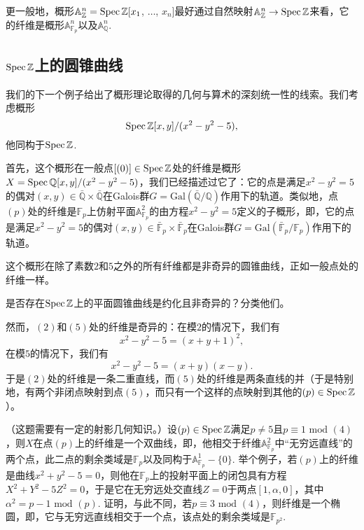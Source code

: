 更一般地，概形$\mathbb{A}_{\mathbb{Z}}^n=\operatorname{Spec} \mathbb{Z}[x_1$, $\dots$, $x_n]$最好通过自然映射$\mathbb{A}_{\mathbb{Z}}^n\to\operatorname{Spec} \mathbb{Z}$来看，它的纤维是概形$\mathbb{A}_{\mathbb{F}_p}^n$以及$\mathbb{A}_{\mathbb{Q}}^n$.

\subsection{$\operatorname{Spec} \mathbb{Z}$上的圆锥曲线}\label{sec:2.4.4}

我们的下一个例子给出了概形理论取得的几何与算术的深刻统一性的线索。我们考虑概形
\[
	\operatorname{Spec} \mathbb{Z}[x,y]/(x^2-y^2-5),
\]
他同构于$\operatorname{Spec} \mathbb{Z}$.

首先，这个概形在一般点$[(0)]\in \operatorname{Spec} \mathbb{Z}$处的纤维是概形$X=\operatorname{Spec} \mathbb{Q}[x,y]/(x^2-y^2-5)$，我们已经描述过它了：它的点是满足$x^2-y^2=5$的偶对$(x,y)\in \bar{\mathbb{Q}}\times \bar{\mathbb{Q}}$在Galois群$G=\mathrm{Gal}(\bar{\mathbb{Q}}/\mathbb{Q})$作用下的轨道。类似地，点$(p)$处的纤维是$\mathbb{F}_p$上仿射平面$\mathbb{A}_{\mathbb{F}_p}^2$的由方程$x^2-y^2=5$定义的子概形，即，它的点是满足$x^2-y^2=5$的偶对$(x,y)\in \bar{\mathbb{F}}_p\times \bar{\mathbb{F}}_p$在Galois群$G=\mathrm{Gal}(\bar{\mathbb{F}}_p/\mathbb{F}_p)$作用下的轨道。

这个概形在除了素数$2$和$5$之外的所有纤维都是非奇异的圆锥曲线，正如一般点处的纤维一样。

\begin{exe}
	是否存在$\operatorname{Spec} \mathbb{Z}$上的平面圆锥曲线是约化且非奇异的？分类他们。
\end{exe}

然而，$(2)$和$(5)$处的纤维是奇异的：在模$2$的情况下，我们有
\[
	x^2-y^2-5=(x+y+1)^2,
\]
在模$5$的情况下，我们有
\[
	x^2-y^2-5=(x+y)(x-y).
\]
于是$(2)$处的纤维是一条二重直线，而$(5)$处的纤维是两条直线的并（于是特别地，有两个非闭点映射到点$(5)$，而只有一个这样的点映射到其他的$(p)\in \operatorname{Spec} \mathbb{Z}$）。




\begin{exe}
	（这题需要有一定的射影几何知识。）设$(p)\in\operatorname{Spec}\mathbb{Z}$满足$p\neq 5$且$p\equiv 1\text{ mod } (4)$，则$X$在点$(p)$上的纤维是一个双曲线，即，他相交于纤维$\mathbb{A}_{\mathbb{F}_p}^2$中“无穷远直线”的两个点，此二点的剩余类域是$\mathbb{F}_p$以及同构于$\mathbb{A}_{\mathbb{F}_p}^1-\{0\}$. 举个例子，若$(p)$上的纤维是曲线$x^2+y^2-5=0$，则他在$\mathbb{F}_p$上的投射平面上的闭包具有方程$X^2+Y^2-5Z^2=0$，于是它在无穷远处交直线$Z=0$于两点$[1,\alpha,0]$，其中$\alpha^2=p-1\text{ mod } (p)$. 证明，与此不同，若$p\equiv 3\text{ mod } (4)$，则纤维是一个椭圆，即，它与无穷远直线相交于一个点，该点处的剩余类域是$\mathbb{F}_{p^2}$.
\end{exe}

